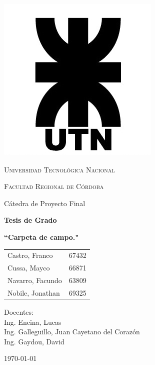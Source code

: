\begin{titlepage}
 \centering
	\includegraphics[scale=0.80]{imagenes/logo_utn.jpg} \par
 	\vspace{1cm}
 	{\scshape\LARGE Universidad Tecnológica Nacional \par}
 	{\scshape\large Facultad Regional de Córdoba \par}
 	\vspace{1cm}
 	{\Large Cátedra de Proyecto Final \par}
	\vspace{0.5cm}
	{\bfseries \LARGE Tesis de Grado \par}
	\vspace{0.5cm}
	 {\bfseries \Large ``Carpeta de campo." \par}

 	\vspace{1.5cm}

	\begin{tabular}{ll}
	    Castro, Franco          &   67432 \\
	    Cussa, Mayco            &   66871 \\
		Navarro, Facundo 	    &	63809 \\
		Nobile, Jonathan        &   69325 
	\end{tabular}
	
	\vspace{1cm}
	
 	\vfill

	Docentes: \\
        Ing. Encina, Lucas \\ 
        Ing. Galleguillo, Juan Cayetano del Corazón \\
        Ing. Gaydou, David 
        
 	\vfill
	{\large \today\par}
\end{titlepage}
